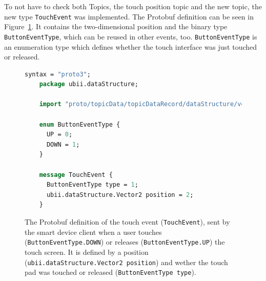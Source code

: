 To not have to check both Topics, the touch position topic and the new topic, the new type \lstinline{TouchEvent} was implemented. The \gls{Protobuf} definition can be seen in Figure~\ref{fig:ubii-event-type}. It contains the two-dimensional position and the binary type \mbox{\lstinline{ButtonEventType},} which can be reused in other events, too. \lstinline{ButtonEventType} is an enumeration type which defines whether the touch interface was just touched or released.

\begin{figure}[H]
	\begin{lstlisting}[language=Protobuf]
    syntax = "proto3";
    package ubii.dataStructure;
    
    import "proto/topicData/topicDataRecord/dataStructure/vector2.proto";
    
    enum ButtonEventType {
      UP = 0;
      DOWN = 1;
    }

    message TouchEvent {
      ButtonEventType type = 1;
      ubii.dataStructure.Vector2 position = 2;
    }
  \end{lstlisting}
	\caption[Protobuf definition of the touch event]{The \gls{Protobuf} definition of the touch event (\lstinline{TouchEvent}), sent by the smart device client when a user touches (\lstinline{ButtonEventType.DOWN}) or releases (\lstinline{ButtonEventType.UP}) the touch screen. It is defined by a position (\lstinline{ubii.dataStructure.Vector2 position}) and wether the touch pad was touched or released (\lstinline{ButtonEventType type}).}\label{fig:ubii-event-type}
\end{figure}
